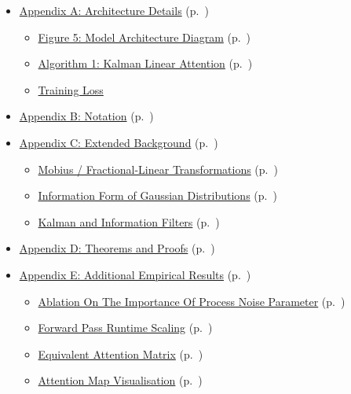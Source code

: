 \documentclass{article}
\begin{document}
\begin{itemize}
    \item \hyperref[app:architecture]{Appendix A: Architecture Details} (p.~\pageref{app:architecture})
    \begin{itemize}
        \item \hyperref[fig:gauss_mamba_arc]{Figure 5: Model Architecture Diagram} (p.~\pageref{fig:gauss_mamba_arc})
        \item \hyperref[alg:kla]{Algorithm 1: Kalman Linear Attention} (p.~\pageref{alg:kla})
        \item \hyperref[app:loss]{Training Loss}
    \end{itemize}

    \item \hyperref[app:notations]{Appendix B: Notation} (p.~\pageref{app:notations})

    \item \hyperref[app:ex-background]{Appendix C: Extended Background} (p.~\pageref{app:ex-background})
    \begin{itemize}
        \item \hyperref[sec:mobius]{Mobius / Fractional-Linear Transformations} (p.~\pageref{sec:mobius})
        \item \hyperref[sec:information-form]{Information Form of Gaussian Distributions} (p.~\pageref{sec:information-form})
        \item \hyperref[app:primer-nlp-kf]{Kalman and Information Filters} (p.~\pageref{app:primer-nlp-kf})
    \end{itemize}

    \item \hyperref[app:theorems-proofs]{Appendix D: Theorems and Proofs} (p.~\pageref{app:theorems-proofs})

    \item \hyperref[app:empirical]{Appendix E: Additional Empirical Results} (p.~\pageref{app:empirical})
    \begin{itemize}
        \item \hyperref[sec:gauss-variants]{Ablation On The Importance Of Process Noise Parameter} (p.~\pageref{sec:gauss-variants})
        \item \hyperref[sec:fwd-scaling]{Forward Pass Runtime Scaling} (p.~\pageref{sec:fwd-scaling})
        \item \hyperref[sec:attn-matrix]{Equivalent Attention Matrix} (p.~\pageref{sec:attn-matrix})
        \item \hyperref[sec:attention-viz]{Attention Map Visualisation} (p.~\pageref{sec:attention-viz})
    \end{itemize}


\end{itemize}
\end{document}
